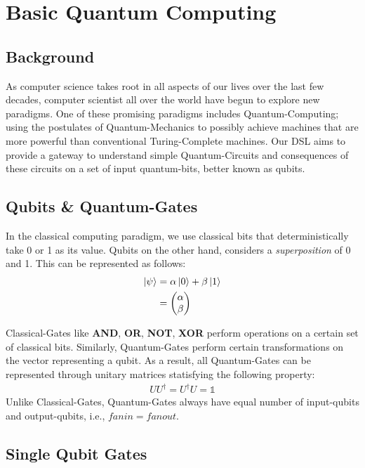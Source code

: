 \chapter{Basic Quantum Computing}
 \setcounter{page}{1}

\section{Background}

As computer science takes root in all aspects of our lives over the last few decades, computer scientist all over the world have begun to explore new paradigms.
One of these promising paradigms includes Quantum-Computing; using the postulates of Quantum-Mechanics to possibly achieve machines that are more powerful than conventional Turing-Complete machines.
Our DSL aims to provide a gateway to understand simple Quantum-Circuits and consequences of these circuits on a set of input quantum-bits, better known as qubits.

\section{Qubits \& Quantum-Gates}

In the classical computing paradigm, we use classical bits that deterministically take 0 or 1 as its value. Qubits on the other hand, considers a \emph{superposition} of 0 and 1.
This can be represented as follows:
\begin{align}
    \ket{\psi} &= \alpha\ket{0} + \beta\ket{1} \\
        &= \begin{pmatrix}\alpha\\\beta\end{pmatrix}
\end{align}

Classical-Gates like \textbf{AND}, \textbf{OR}, \textbf{NOT}, \textbf{XOR} perform operations on a certain set of classical bits. Similarly, Quantum-Gates 
perform certain transformations on the vector representing a qubit. As a result, all Quantum-Gates can be represented through unitary matrices statisfying the 
following property:
\begin{align}
    UU^{\dag} = U^{\dag}U = \mathds{1}
\end{align}
Unlike Classical-Gates, Quantum-Gates always have equal number of input-qubits and output-qubits, i.e., $fanin = fanout$.

\section{Single Qubit Gates}

